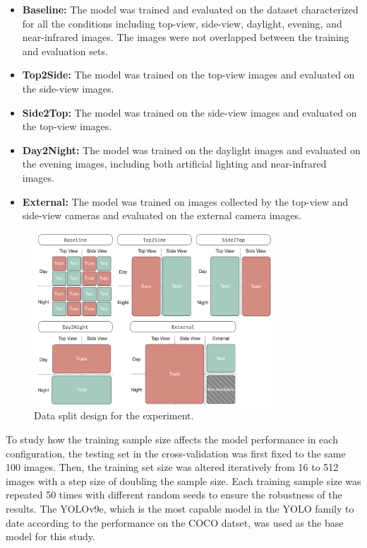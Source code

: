 \begin{itemize}
    \item \textbf{Baseline:} The model was trained and evaluated on the dataset characterized for all the conditions including top-view, side-view, daylight, evening, and near-infrared images. The images were not overlapped between the training and evaluation sets.
    \item \textbf{Top2Side:} The model was trained on the top-view images and evaluated on the side-view images.
    \item \textbf{Side2Top:} The model was trained on the side-view images and evaluated on the top-view images.
    \item \textbf{Day2Night:} The model was trained on the daylight images and evaluated on the evening images, including both artificial lighting and near-infrared images.
    \item \textbf{External:} The model was trained on images collected by the top-view and side-view cameras and evaluated on the external camera images.
\end{itemize}


\begin{figure}[h]
    \centering
    \includegraphics[width=0.8\textwidth]{figure_2.jpg}
    \caption{Data split design for the experiment.}
    \label{fig:splits}
\end{figure}

To study how the training sample size affects the model performance in each configuration, the testing set in the cross-validation was first fixed to the same 100 images. Then, the training set size was altered iteratively from 16 to 512 images with a step size of doubling the sample size. Each training sample size was repeated 50 times with different random seeds to ensure the robustness of the results. The YOLOv9e, which is the most capable model in the YOLO family to date according to the performance on the COCO datset, was used as the base model for this study.


